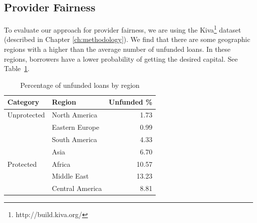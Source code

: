 

\subsection{Provider Fairness}

To evaluate our approach for provider fairness, we are using the Kiva\footnote{http://build.kiva.org/} dataset (described in Chapter \ref{ch:methodology}). We find that there are some geographic regions with a higher than the average number of unfunded loans. In these regions, borrowers have a lower probability of getting the desired capital. See Table~\ref{tab:unfunded}.



\begin{table}
    \centering
\begin{tabular}{l|l|r}
    Category & Region & Unfunded \% \\ \hline
    Unprotected & North America & 1.73 \\
    & Eastern Europe & 0.99 \\
    & South America & 4.33 \\
    & Asia & 6.70 \\ \hline
    Protected & Africa & 10.57 \\
    & Middle East & 13.23 \\
    & Central America & 8.81 \\
\end{tabular}
    \caption{Percentage of unfunded loans by region}
    \label{tab:unfunded}
\end{table}

